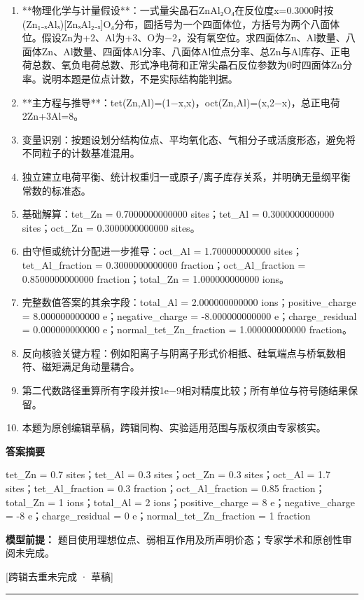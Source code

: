 \documentclass[UTF8,11pt,a4paper]{ctexart}
\begin{document}
\begin{enumerate}
\item **物理化学与计量假设**：一式量尖晶石ZnAl₂O₄在反位度x=0.3000时按(Zn₁₋ₓAlₓ)[ZnₓAl₂₋ₓ]O₄分布，圆括号为一个四面体位，方括号为两个八面体位。假设Zn为+2、Al为+3、O为−2，没有氧空位。求四面体Zn、Al数量、八面体Zn、Al数量、四面体Al分率、八面体Al位点分率、总Zn与Al库存、正电荷总数、氧负电荷总数、形式净电荷和正常尖晶石反位参数为0时四面体Zn分率。说明本题是位点计数，不是实际结构能判据。
\item **主方程与推导**：tet(Zn,Al)=(1−x,x)，oct(Zn,Al)=(x,2−x)，总正电荷2Zn+3Al=8。
\item 变量识别：按题设划分结构位点、平均氧化态、气相分子或活度形态，避免将不同粒子的计数基准混用。
\item 独立建立电荷平衡、统计权重归一或原子/离子库存关系，并明确无量纲平衡常数的标准态。
\item 基础解算：tet\_Zn = 0.7000000000000 sites；tet\_Al = 0.3000000000000 sites；oct\_Zn = 0.3000000000000 sites。
\item 由守恒或统计分配进一步推导：oct\_Al = 1.700000000000 sites；tet\_Al\_fraction = 0.3000000000000 fraction；oct\_Al\_fraction = 0.8500000000000 fraction；total\_Zn = 1.000000000000 ions。
\item 完整数值答案的其余字段：total\_Al = 2.000000000000 ions；positive\_charge = 8.000000000000 e；negative\_charge = -8.000000000000 e；charge\_residual = 0.000000000000 e；normal\_tet\_Zn\_fraction = 1.000000000000 fraction。
\item 反向核验关键方程：例如阳离子与阴离子形式价相抵、硅氧端点与桥氧数相符、磁矩满足角动量耦合。
\item 第二代数路径重算所有字段并按1e−9相对精度比较；所有单位与符号随结果保留。
\item 本题为原创编辑草稿，跨辑同构、实验适用范围与版权须由专家核实。
\end{enumerate}
\noindent\textbf{答案摘要}\par
tet\_Zn = 0.7 sites；tet\_Al = 0.3 sites；oct\_Zn = 0.3 sites；oct\_Al = 1.7 sites；tet\_Al\_fraction = 0.3 fraction；oct\_Al\_fraction = 0.85 fraction；total\_Zn = 1 ions；total\_Al = 2 ions；positive\_charge = 8 e；negative\_charge = -8 e；charge\_residual = 0 e；normal\_tet\_Zn\_fraction = 1 fraction\par
\noindent\textbf{模型前提：}
题目使用理想位点、弱相互作用及所声明价态；专家学术和原创性审阅未完成。\par
\noindent\textcolor{red!65!black}{[跨辑去重未完成 · 草稿]} \par
\medskip\hrule\medskip
{}
\end{document}
